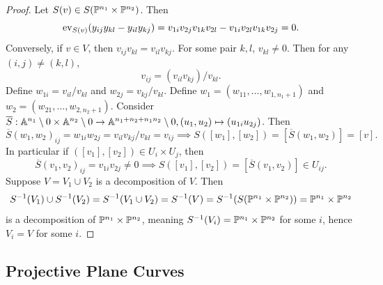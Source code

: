         \begin{proof}
            Let $S(v)\in S(\mathbb{P}^{n_1}\times \mathbb{P}^{n_2})$. Then 
            $$\mathrm{ev}_{S(v)}(y_{ij}y_{kl}-y_{il}y_{kj})=v_{1i}v_{2j}v_{1k}v_{2l}-v_{1i}v_{2l}v_{1k}v_{2j}=0.$$
            Conversely, if $v\in V$, then $v_{ij}v_{kl}=v_{il}v_{kj}$. For some pair $k,l$, $v_{kl}\neq0$. Then for any $(i,j)\neq (k,l)$, 
            $$
                v_{ij}=(v_{il}v_{kj})/v_{kl}.
            $$ Define $w_{1i} = v_{il}/v_{kl}$ and $w_{2j}=v_{kj}/v_{kl}$. Define $w_1 = (w_{11},\dots,w_{1,n_1+1})$ and $w_2 = (w_{21},\dots,w_{2,n_2+1})$. Consider $\overline{S}: \mathbb{A}^{n_1}\setminus0\times \mathbb{A}^{n_2}\setminus0 \rightarrow \mathbb{A}^{n_1+n_2+n_1n_2}\setminus0, (u_1,u_2)\mapsto (u_{1i}u_{2j})$. Then 
            $$\overline{S}(w_1,w_2)_{ij}= w_{1i}w_{2j}= v_{il}v_{kj}/v_{kl} = v_{ij}\implies S([w_1],[w_2])=[\overline{S}(w_1,w_2)] = [v].$$
            In particular if $([v_1],[v_2])\in U_i\times U_j$, then 
            $$\overline{S}(v_1,v_2)_{ij}=v_{1i}v_{2j}\neq 0 \implies S([v_1],[v_2])=[\overline{S}(v_1,v_2)]\in U_{ij}.$$
            Suppose $V=V_1\cup V_2$ is a decomposition of $V$. Then 
            $$S^{-1}(V_1)\cup S^{-1}(V_2) = S^{-1}(V_1\cup V_2) = S^{-1}(V)=S^{-1}(S(\mathbb{P}^{n_1}\times \mathbb{P}^{n_2})) = \mathbb{P}^{n_1}\times \mathbb{P}^{n_2}$$
            is a decomposition of $\mathbb{P}^{n_1}\times \mathbb{P}^{n_2}$, meaning $S^{-1}(V_i) = \mathbb{P}^{n_1}\times \mathbb{P}^{n_2}$ for some $i$, hence $V_i= V$ for some $i$.
        \end{proof}
\subsection{Projective Plane Curves}
